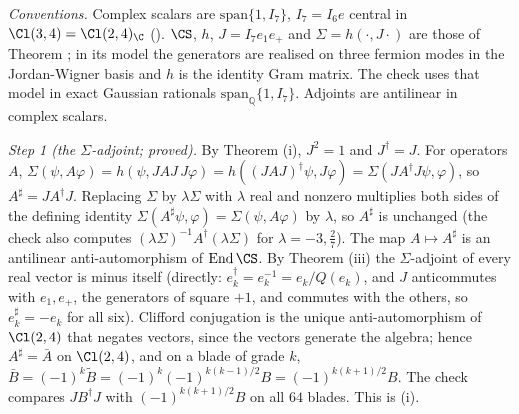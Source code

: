 \emph{Conventions.} Complex scalars are $\mathrm{span}\{1, I_{7}\}$, $I_{7} = I_{6}e$ central in $\Cl(3,4) = \Cl(2,4)_{\C}$ (). $\CS$, $h$, $J = I_{7}e_{1}e_{+}$ and $\Sigma = h(\cdot, J\cdot)$ are those of Theorem ; in its model the generators are realised on three fermion modes in the Jordan-Wigner basis and $h$ is the identity Gram matrix. The check uses that model in exact Gaussian rationals $\mathrm{span}_{\mathbb{Q}}\{1, I_{7}\}$. Adjoints are antilinear in complex scalars.

\emph{Step 1 (the $\Sigma$-adjoint; proved).} By Theorem (i), $J^{2} = 1$ and $J^{\dagger} = J$. For operators $A$, $\Sigma(\psi, A\varphi) = h(\psi, JAJ\,J\varphi) = h((JAJ)^{\dagger}\psi, J\varphi) = \Sigma(JA^{\dagger}J\psi, \varphi)$, so $A^{\sharp} = JA^{\dagger}J$. Replacing $\Sigma$ by $\lambda\Sigma$ with $\lambda$ real and nonzero multiplies both sides of the defining identity $\Sigma(A^{\sharp}\psi, \varphi) = \Sigma(\psi, A\varphi)$ by $\lambda$, so $A^{\sharp}$ is unchanged (the check also computes $(\lambda\Sigma)^{-1}A^{\dagger}(\lambda\Sigma)$ for $\lambda = -3, \tfrac27$). The map $A \mapsto A^{\sharp}$ is an antilinear anti-automorphism of $\operatorname{End}\CS$. By Theorem (iii) the $\Sigma$-adjoint of every real vector is minus itself (directly: $e_{k}^{\dagger} = e_{k}^{-1} = e_{k}/Q(e_{k})$, and $J$ anticommutes with $e_{1}, e_{+}$, the generators of square $+1$, and commutes with the others, so $e_{k}^{\sharp} = -e_{k}$ for all six). Clifford conjugation is the unique anti-automorphism of $\Cl(2,4)$ that negates vectors, since the vectors generate the algebra; hence $A^{\sharp} = \bar A$ on $\Cl(2,4)$, and on a blade of grade $k$, $\bar B = (-1)^{k}\widetilde B = (-1)^{k}(-1)^{k(k-1)/2}B = (-1)^{k(k+1)/2}B$. The check compares $JB^{\dagger}J$ with $(-1)^{k(k+1)/2}B$ on all $64$ blades. This is (i).

